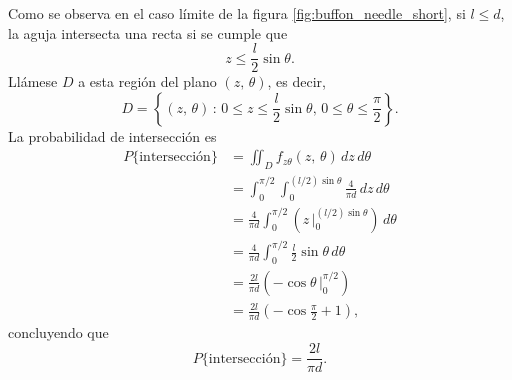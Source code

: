 \documentclass[a4paper]{report}
\begin{document}
Como se observa en el caso límite de la figura \ref{fig:buffon_needle_short}, si \(l\leq d\), la aguja intersecta una recta si se cumple que
\[
 z\leq\frac{l}{2}\sin{\theta}.
\]
Llámese \(D\) a esta región del plano \((z,\,\theta)\), es decir,
\[
 D=\left\{(z,\,\theta)\,:\,0\leq z\leq\frac{l}{2}\sin{\theta},\,0\leq\theta\leq\frac{\pi}{2}\right\}.
\]
La probabilidad de intersección es
\begin{align*}
 P\{\textrm{intersección}\}&=\iint_{D}f_{z\theta}(z,\,\theta)\,dz\,d\theta\\
  &=\int_{0}^{\pi/2}\int_{0}^{(l/2)\sin\theta}\frac{4}{\pi d}\,dz\,d\theta\\
  &=\frac{4}{\pi d}\int_{0}^{\pi/2}\left(z\,\bigg|_{0}^{(l/2)\sin\theta}\right)\,d\theta\\
  &=\frac{4}{\pi d}\int_{0}^{\pi/2}\frac{l}{2}\sin\theta\,d\theta\\
  &=\frac{2l}{\pi d}\left(-\cos\theta\,\bigg|_{0}^{\pi/2}\right)\\
  &=\frac{2l}{\pi d}\left(-\cos\frac{\pi}{2}+1\right),
\end{align*}
concluyendo que
\[
 P\{\textrm{intersección}\}=\frac{2l}{\pi d}.
\]
\end{document}
